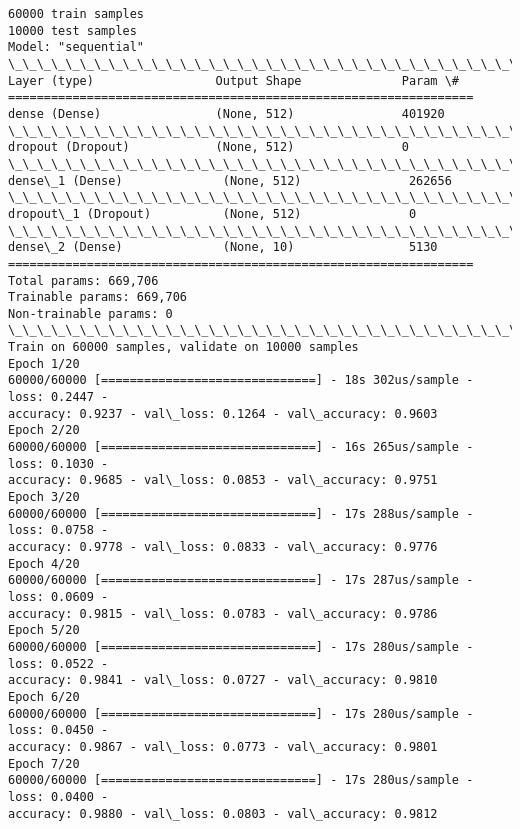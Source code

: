 \documentclass[11pt]{article}
\begin{document}
    \begin{Verbatim}[commandchars=\\\{\}]
60000 train samples
10000 test samples
Model: "sequential"
\_\_\_\_\_\_\_\_\_\_\_\_\_\_\_\_\_\_\_\_\_\_\_\_\_\_\_\_\_\_\_\_\_\_\_\_\_\_\_\_\_\_\_\_\_\_\_\_\_\_\_\_\_\_\_\_\_\_\_\_\_\_\_\_\_
Layer (type)                 Output Shape              Param \#
=================================================================
dense (Dense)                (None, 512)               401920
\_\_\_\_\_\_\_\_\_\_\_\_\_\_\_\_\_\_\_\_\_\_\_\_\_\_\_\_\_\_\_\_\_\_\_\_\_\_\_\_\_\_\_\_\_\_\_\_\_\_\_\_\_\_\_\_\_\_\_\_\_\_\_\_\_
dropout (Dropout)            (None, 512)               0
\_\_\_\_\_\_\_\_\_\_\_\_\_\_\_\_\_\_\_\_\_\_\_\_\_\_\_\_\_\_\_\_\_\_\_\_\_\_\_\_\_\_\_\_\_\_\_\_\_\_\_\_\_\_\_\_\_\_\_\_\_\_\_\_\_
dense\_1 (Dense)              (None, 512)               262656
\_\_\_\_\_\_\_\_\_\_\_\_\_\_\_\_\_\_\_\_\_\_\_\_\_\_\_\_\_\_\_\_\_\_\_\_\_\_\_\_\_\_\_\_\_\_\_\_\_\_\_\_\_\_\_\_\_\_\_\_\_\_\_\_\_
dropout\_1 (Dropout)          (None, 512)               0
\_\_\_\_\_\_\_\_\_\_\_\_\_\_\_\_\_\_\_\_\_\_\_\_\_\_\_\_\_\_\_\_\_\_\_\_\_\_\_\_\_\_\_\_\_\_\_\_\_\_\_\_\_\_\_\_\_\_\_\_\_\_\_\_\_
dense\_2 (Dense)              (None, 10)                5130
=================================================================
Total params: 669,706
Trainable params: 669,706
Non-trainable params: 0
\_\_\_\_\_\_\_\_\_\_\_\_\_\_\_\_\_\_\_\_\_\_\_\_\_\_\_\_\_\_\_\_\_\_\_\_\_\_\_\_\_\_\_\_\_\_\_\_\_\_\_\_\_\_\_\_\_\_\_\_\_\_\_\_\_
Train on 60000 samples, validate on 10000 samples
Epoch 1/20
60000/60000 [==============================] - 18s 302us/sample - loss: 0.2447 -
accuracy: 0.9237 - val\_loss: 0.1264 - val\_accuracy: 0.9603
Epoch 2/20
60000/60000 [==============================] - 16s 265us/sample - loss: 0.1030 -
accuracy: 0.9685 - val\_loss: 0.0853 - val\_accuracy: 0.9751
Epoch 3/20
60000/60000 [==============================] - 17s 288us/sample - loss: 0.0758 -
accuracy: 0.9778 - val\_loss: 0.0833 - val\_accuracy: 0.9776
Epoch 4/20
60000/60000 [==============================] - 17s 287us/sample - loss: 0.0609 -
accuracy: 0.9815 - val\_loss: 0.0783 - val\_accuracy: 0.9786
Epoch 5/20
60000/60000 [==============================] - 17s 280us/sample - loss: 0.0522 -
accuracy: 0.9841 - val\_loss: 0.0727 - val\_accuracy: 0.9810
Epoch 6/20
60000/60000 [==============================] - 17s 280us/sample - loss: 0.0450 -
accuracy: 0.9867 - val\_loss: 0.0773 - val\_accuracy: 0.9801
Epoch 7/20
60000/60000 [==============================] - 17s 280us/sample - loss: 0.0400 -
accuracy: 0.9880 - val\_loss: 0.0803 - val\_accuracy: 0.9812

\end{Verbatim}
\end{document}
